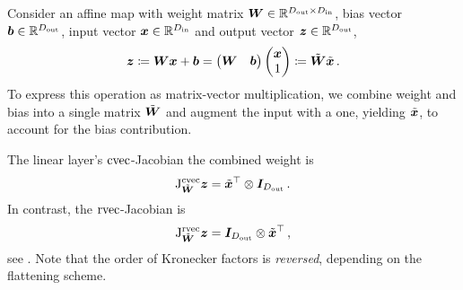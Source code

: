 \switchcolumn[1]
\begin{example}\label{ex:linear_layer_jacobians}
  Consider an affine map with weight matrix ${\bm{W}} \in {\mathbb{R}}^{D_{\text{out}} \times D_{\text{in}}}$, bias vector ${\bm{b}} \in {\mathbb{R}}^{D_{\text{out}}}$, input vector ${\bm{x}} \in {\mathbb{R}}^{D_{\text{in}}}$ and output vector ${\bm{z}} \in {\mathbb{R}}^{D_{\text{out}}}$,
  \begin{align*}
    {\bm{z}}
    \coloneqq
    {\bm{W}} {\bm{x}} + {\bm{b}}
    =
    \begin{pmatrix}
      {\bm{W}} & {\bm{b}}
    \end{pmatrix}
    \begin{pmatrix}
      {\bm{x}} \\ 1
    \end{pmatrix}
    \coloneqq
    \tilde{{\bm{W}}}
    \tilde{{\bm{x}}}\,.
  \end{align*}
  To express this operation as matrix-vector multiplication, we combine weight and bias into a single matrix $\tilde{{\bm{W}}}$ and augment the input with a one, yielding $\tilde{{\bm{x}}}$, to account for the bias contribution.

  The linear layer's $\operatorname{cvec}$-Jacobian \wrt the combined weight is
  \begin{align*}
    \mathrm{J}^{\operatorname{cvec}}_{\tilde{{\bm{W}}}}{\bm{z}}
    =
    \tilde{{\bm{x}}}^{\top}
    \otimes
    {\bm{I}}_{D_{\text{out}}}\,.
  \end{align*}
  In contrast, the $\operatorname{rvec}$-Jacobian is
  \begin{align*}
    \mathrm{J}^{\operatorname{rvec}}_{\tilde{{\bm{W}}}}{\bm{z}}
    =
    {\bm{I}}_{D_{\text{out}}}
    \otimes
    \tilde{{\bm{x}}}^{\top}\,,
  \end{align*}
  see .
  Note that the order of Kronecker factors is \emph{reversed}, depending on the flattening scheme.
\end{example}
\switchcolumn[0]

\switchcolumn[1]
\switchcolumn[0]



